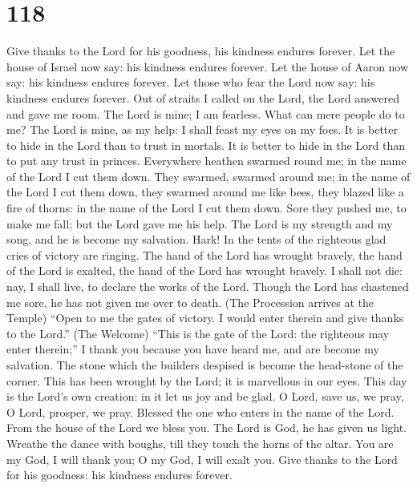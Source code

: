 \hypertarget{section-117}{%
\section{118}\label{section-117}}

 Give thanks to the Lord for his goodness, his kindness
endures forever.  Let the house of Israel now say: his
kindness endures forever.  Let the house of Aaron now say:
his kindness endures forever.  Let those who fear the Lord
now say: his kindness endures forever.  Out of straits I
called on the Lord, the Lord answered and gave me room.  The
Lord is mine; I am fearless. What can mere people do to me? 
The Lord is mine, as my help: I shall feast my eyes on my foes.
 It is better to hide in the Lord than to trust in mortals.
 It is better to hide in the Lord than to put any trust in
princes.  Everywhere heathen swarmed round me; in the name
of the Lord I cut them down.  They swarmed, swarmed around
me; in the name of the Lord I cut them down,  they swarmed
around me like bees, they blazed like a fire of thorns: in the name of
the Lord I cut them down.  Sore they pushed me, to make me
fall; but the Lord gave me his help.  The Lord is my
strength and my song, and he is become my salvation.  Hark!
In the tents of the righteous glad cries of victory are ringing. The
hand of the Lord has wrought bravely,  the hand of the Lord
is exalted, the hand of the Lord has wrought bravely.  I
shall not die: nay, I shall live, to declare the works of the Lord.
 Though the Lord has chastened me sore, he has not given me
over to death. (The Procession arrives at the Temple) 
``Open to me the gates of victory. I would enter therein and give thanks
to the Lord.'' (The Welcome)  ``This is the gate of the
Lord: the righteous may enter therein;''  I thank you
because you have heard me, and are become my salvation. 
The stone which the builders despised is become the head-stone of the
corner.  This has been wrought by the Lord; it is
marvellous in our eyes.  This day is the Lord's own
creation: in it let us joy and be glad.  O Lord, save us,
we pray, O Lord, prosper, we pray.  Blessed the one who
enters in the name of the Lord. From the house of the Lord we bless you.
 The Lord is God, he has given us light. Wreathe the dance
with boughs, till they touch the horns of the altar.  You
are my God, I will thank you; O my God, I will exalt you. 
Give thanks to the Lord for his goodness: his kindness endures forever.

